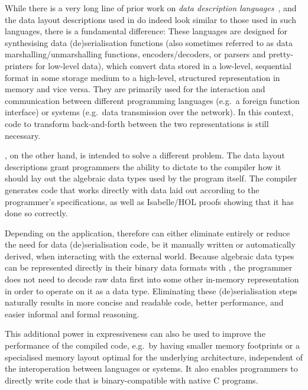 While there is a very long line of prior work on \emph{data description
languages}~\citep{FisherG05, McCannC00, Back02, WangG11, everparse,
Ye_Delaware_19, vanGeest_Swierstra_17, Slind_21}, and the data layout
descriptions used in \dargent do indeed look similar to those used in such
languages, there is a fundamental difference: These languages are
designed for synthesising data (de)serialisation functions (also sometimes
referred to as data marshalling/unmarshalling functions, encoders/decoders, 
or parsers and pretty-printers for low-level data),
which convert data stored in a low-level, sequential format in some storage
medium to a high-level, structured representation in memory and vice versa. 
They are primarily used for the interaction and communication between
different programming languages (e.g.\ a foreign function interface)
or systems (e.g.\ data transmission over the network). In this context, code to transform back-and-forth
between the two representations is still necessary.

\dargent, on the other hand, is intended to solve a different
problem. The \dargent data layout descriptions grant programmers
the ability to dictate to the \cogent compiler how it should lay out the algebraic data
types used by the \cogent program itself. The compiler generates code that works directly 
with data laid out according to the programmer's specifications, as well as Isabelle/HOL  
proofs showing that it has done so correctly. 

Depending on the application, \dargent therefore can either eliminate entirely
or reduce the need for data (de)serialisation code, be it manually
written or automatically derived, when interacting with the external world.
Because algebraic data types can be represented directly in their binary data formats with \dargent,  the 
programmer does not need
to decode raw data first into some other in-memory representation in order to operate on it as a data type. Eliminating these (de)serialisation steps naturally results in more concise and readable code, better performance, and easier informal and 
formal reasoning.

This additional power in expressiveness can also be
used to improve the performance of the compiled \cogent code, 
e.g.\ by having smaller memory footprints or a specialised memory
layout optimal for the underlying architecture,
independent of the interoperation between languages or systems.
It also enables \cogent programmers to directly write code that is binary-compatible
with native C programs.

